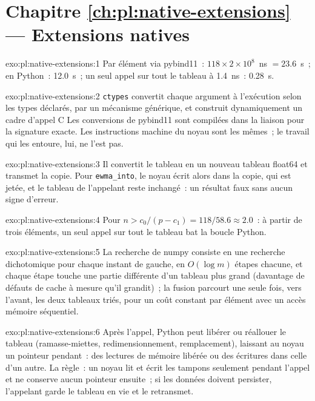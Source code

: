 \section*{Chapitre \ref{ch:pl:native-extensions} --- Extensions natives}

\begin{solution}{exo:pl:native-extensions:1}
Par élément via pybind11~: $118 \times 2\times10^8$~ns $= 23.6$~s~; en Python~: 12.0~s~; un seul appel sur tout le tableau à 1.4~ns~: 0.28~s.
\end{solution}

\begin{solution}{exo:pl:native-extensions:2}
\texttt{ctypes} convertit chaque argument à l'exécution selon les types déclarés, par un mécanisme générique, et construit dynamiquement un cadre d'appel C
Les conversions de pybind11 sont compilées dans la liaison pour la signature exacte. Les instructions machine du noyau sont les
mêmes~; le travail qui les entoure, lui, ne l'est pas.
\end{solution}

\begin{solution}{exo:pl:native-extensions:3}
Il convertit le tableau en un nouveau tableau float64 et transmet la copie. Pour \texttt{ewma\_into}, le noyau écrit alors dans la copie, qui est
jetée, et le tableau de l'appelant reste inchangé~: un résultat faux sans aucun signe d'erreur.
\end{solution}

\begin{solution}{exo:pl:native-extensions:4}
Pour $n > c_0/(p - c_1) = 118/58.6 \approx 2.0$~: à partir de trois éléments, un seul appel sur tout le tableau bat la boucle Python.
\end{solution}

\begin{solution}{exo:pl:native-extensions:5}
La recherche de numpy consiste en une recherche dichotomique pour chaque instant de gauche, en $O(\log m)$ étapes chacune, et chaque étape touche une partie différente d'un tableau plus grand
(davantage de défauts de cache à mesure qu'il grandit)~; la fusion parcourt une seule fois, vers l'avant, les deux tableaux triés, pour un coût constant par élément avec un
accès mémoire séquentiel.
\end{solution}

\begin{solution}{exo:pl:native-extensions:6}
Après l'appel, Python peut libérer ou réallouer le tableau (ramasse-miettes, redimensionnement, remplacement), laissant au noyau un
pointeur pendant~: des lectures de mémoire libérée ou des écritures dans celle d'un autre. La règle~: un noyau lit et écrit les tampons seulement pendant l'appel et ne conserve
aucun pointeur ensuite~; si les données doivent persister, l'appelant garde le tableau en vie et le retransmet.
\end{solution}

